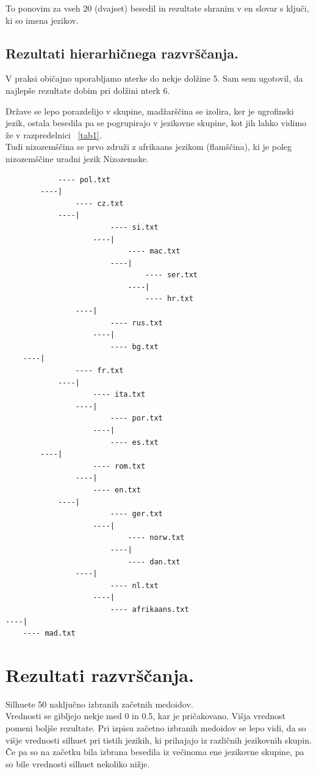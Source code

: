 \documentclass[a4paper,11pt]{article}
\begin{document}
To ponovim za vseh 20 (dvajset) besedil in rezultate shranim v en slovar s ključi, ki so imena jezikov.


\subsection{Rezultati hierarhičnega razvrščanja.}
V praksi običajno uporabljamo nterke do nekje dolžine 5. Sam sem ugotovil, da najlepše rezultate dobim pri dolžini nterk 6.

Države se lepo porazdelijo v skupine, madžarščina se izolira, ker je ugrofinski jezik, ostala besedila pa se pogrupirajo v jezikovne skupine, kot jih lahko vidimo že v razpredelnici ~\ref{tab1}. \\
Tudi nizozemščina se prvo združi z afrikaans jezikom (flamščina), ki je poleg nizozemščine uradni jezik Nizozemske.

\begin{lstlisting}
            ---- pol.txt
        ----|
                ---- cz.txt
            ----|
                        ---- si.txt
                    ----|
                            ---- mac.txt
                        ----|
                                ---- ser.txt
                            ----|
                                ---- hr.txt
                ----|
                        ---- rus.txt
                    ----|
                        ---- bg.txt
    ----|
                ---- fr.txt
            ----|
                    ---- ita.txt
                ----|
                        ---- por.txt
                    ----|
                        ---- es.txt
        ----|
                    ---- rom.txt
                ----|
                    ---- en.txt
            ----|
                        ---- ger.txt
                    ----|
                            ---- norw.txt
                        ----|
                            ---- dan.txt
                ----|
                        ---- nl.txt
                    ----|
                        ---- afrikaans.txt
----|
    ---- mad.txt
\end{lstlisting}


\section{Rezultati razvrščanja.}

Silhuete 50 naključno izbranih začetnih medoidov.
\\Vrednosti se gibljejo nekje med 0 in 0.5, kar je pričakovano. Višja vrednost pomeni boljše rezultate.
Pri izpisu začetno izbranih medoidov se lepo vidi, da so višje vrednosti silhuet pri tistih jezikih, ki prihajajo iz različnih jezikovnih skupin.
Če pa so na začetku bila izbrana besedila iz večinoma ene jezikovne skupine, pa so bile vrednosti silhuet nekoliko nižje.
\end{document}
